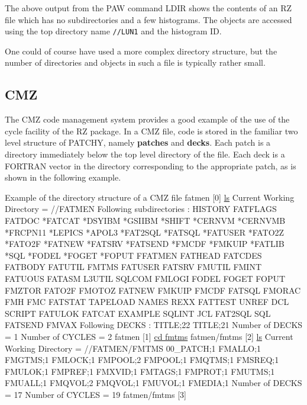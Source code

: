 The above output from the PAW command LDIR shows the contents
of an RZ file which has no subdirectories and a few histograms.
The objects are accessed using the top directory name {\tt //LUN1}
and the histogram ID. 

One could of course have used a more complex directory structure,
but the number of directories and objects in such a file is typically
rather small.

\newpage
\subsection{CMZ}

The CMZ code management system provides a good example of the use
of the cycle facility of the RZ package. In a CMZ file, code is
stored in the familiar two level structure of PATCHY, namely
{\bf patches} and {\bf decks}. Each patch is a directory immediately
below the top level directory of the file. Each deck is a FORTRAN
vector in the directory corresponding to the appropriate
patch, as is shown in the following example.

\begin{XMPt}{Example of the directory structure of a CMZ file}
fatmen [0] \underline{ls}
 Current Working Directory = //FATMEN
 Following subdirectories :
  HISTORY           FATFLAGS          FATDOC            *FATCAT         
  *DSYIBM           *GSIIBM           *SHIFT            *CERNVM         
  *CERNVMB          *FRCPN11          *LEPICS           *APOL3          
  *FAT2SQL          *FATSQL           *FATUSER          *FATO2Z         
  *FATO2F           *FATNEW           *FATSRV           *FATSEND        
  *FMCDF            *FMKUIP           *FATLIB           *SQL            
  *FODEL            *FOGET            *FOPUT            FFATMEN         
  FATHEAD           FATCDES           FATBODY           FATUTIL         
  FMTMS             FATUSER           FATSRV            FMUTIL          
  FMINT             FATUOUS           FATASM            L3UTIL          
  SQLCOM            FMLOGI            FODEL             FOGET           
  FOPUT             FMZTOR            FATO2F            FMOTOZ          
  FATNEW            FMKUIP            FMCDF             FATSQL          
  FMORAC            FMH               FMC               FATSTAT         
  TAPELOAD          NAMES             REXX              FATTEST         
  UNREF             DCL               SCRIPT            FATULOK         
  FATCAT            EXAMPLE           SQLINT            JCL             
  FAT2SQL           SQL               FATSEND           FMVAX
Following DECKS :
 TITLE;22    TITLE;21    
 Number of DECKS =   1 Number of CYCLES =  2
 fatmen [1] \underline{cd fmtms}
 fatmen/fmtms [2] \underline{ls}
 Current Working Directory = //FATMEN/FMTMS
 00_PATCH;1  FMALLO;1    FMGTMS;1    FMLOCK;1    FMPOOL;2    FMPOOL;1    
 FMQTMS;1    FMSREQ;1    FMULOK;1    FMPREF;1    FMXVID;1    FMTAGS;1    
 FMPROT;1    FMUTMS;1    FMUALL;1    FMQVOL;2    FMQVOL;1    FMUVOL;1    
 FMEDIA;1    
 Number of DECKS =  17 Number of CYCLES =  19
 fatmen/fmtms [3]
\end{XMPt}

